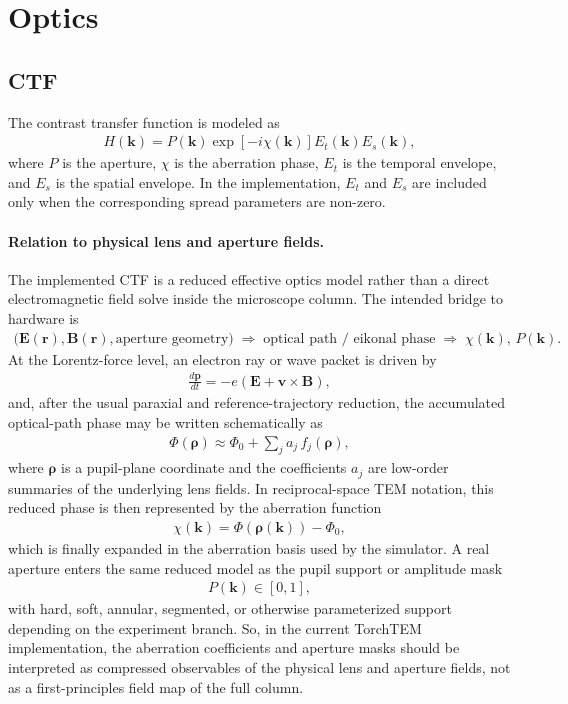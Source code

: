 \documentclass[11pt]{article}
\begin{document}
\section{Optics}
\subsection{CTF}
The contrast transfer function is modeled as
\begin{align}
  H(\mathbf{k})
  = P(\mathbf{k})
    \exp\!\left[- i \chi(\mathbf{k})\right]
    E_t(\mathbf{k})
    E_s(\mathbf{k}),
\end{align}
where $P$ is the aperture, $\chi$ is the aberration phase, $E_t$ is the temporal
envelope, and $E_s$ is the spatial envelope.  In the implementation, $E_t$ and $E_s$
are included only when the corresponding spread parameters are non-zero.

\paragraph{Relation to physical lens and aperture fields.}
The implemented CTF is a reduced effective optics model rather than a direct
electromagnetic field solve inside the microscope column.  The intended bridge to
hardware is
\begin{align}
  \bigl(\mathbf{E}(\mathbf{r}), \mathbf{B}(\mathbf{r}), \text{aperture geometry}\bigr)
  \;\Longrightarrow\;
  \text{optical path / eikonal phase}
  \;\Longrightarrow\;
  \chi(\mathbf{k}),\,P(\mathbf{k}).
\end{align}
At the Lorentz-force level, an electron ray or wave packet is driven by
\begin{align}
  \frac{d\mathbf{p}}{dt}
  =
  -e\left(
    \mathbf{E} + \mathbf{v}\times\mathbf{B}
  \right),
\end{align}
and, after the usual paraxial and reference-trajectory reduction, the accumulated
optical-path phase may be written schematically as
\begin{align}
  \Phi(\boldsymbol{\rho})
  \approx
  \Phi_0
  +
  \sum_j a_j\,f_j(\boldsymbol{\rho}),
\end{align}
where $\boldsymbol{\rho}$ is a pupil-plane coordinate and the coefficients $a_j$ are
low-order summaries of the underlying lens fields.  In reciprocal-space TEM notation,
this reduced phase is then represented by the aberration function
\begin{align}
  \chi(\mathbf{k}) = \Phi\!\left(\boldsymbol{\rho}(\mathbf{k})\right) - \Phi_0,
\end{align}
which is finally expanded in the aberration basis used by the simulator.  A real
aperture enters the same reduced model as the pupil support or amplitude mask
\begin{align}
  P(\mathbf{k}) \in [0,1],
\end{align}
with hard, soft, annular, segmented, or otherwise parameterized support depending on
the experiment branch.  So, in the current TorchTEM implementation, the aberration
coefficients and aperture masks should be interpreted as compressed observables of the
physical lens and aperture fields, not as a first-principles field map of the full
column.
\end{document}
